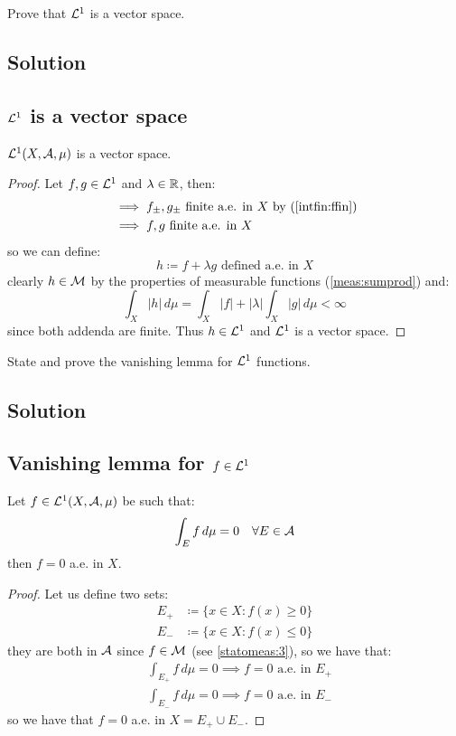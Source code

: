 
\question
Prove that $\mathcal{L}^1$ is a vector space.

\subsection*{Solution}

\subsection{ \texorpdfstring{$\mathcal{L}^1$}{L1} is a vector space}
$\mathcal{L}^1(X,\mathcal{A},\mu)$ is a vector space.

\begin{proof}
    Let $f,g\in\mathcal{L}^1$ and $\lambda\in\mathbb{R}$, then:
    \begin{align*}
        & \implies f_{\pm}, g_{\pm} \text{ finite a.e. in } X \text{ by (\ref{intfin:ffin})} \\
        & \implies f,g \text{ finite a.e. in } X
    \end{align*}
    so we can define:
    \[
        h \coloneqq f+ \lambda g \text{ defined a.e. in } X
    \]
    clearly $h\in\mathcal{M}$ by the properties of measurable functions (\ref{meas:sumprod}) and:
    \[
        \int_X |h| \, d\mu = \int_X |f| + |\lambda| \int_X |g| \, d\mu < \infty 
    \]
    since both addenda are finite. Thus $h\in\mathcal{L}^1$ and 
    $\mathcal{L}^1$ is a vector space.
\end{proof}


\question
State and prove the vanishing lemma for $\mathcal{L}^1$ functions.

\subsection*{Solution}

\subsection{Vanishing lemma for \texorpdfstring{$f\in\mathcal{L}^1$}{integrable functions}}
Let $f\in\mathcal{L}^1(X,\mathcal{A},\mu)$ be such that:
\[
    \int_E f \, d\mu = 0 \quad \forall E \in \mathcal{A}
\]
then $f=0$ a.e. in $X$.

\begin{proof}
    Let us define two sets:
    \begin{align*}
        E_+ & \coloneqq \{x\in X : f(x) \geq 0\} \\
        E_- & \coloneqq \{x\in X : f(x) \leq 0\}
    \end{align*}
    they are both in $\mathcal{A}$ since $f\in\mathcal{M}$ (see \ref{statomeas:3}), so we have that:
    \begin{align*}
        & \int_{E_+} f \, d\mu = 0 \implies f=0 \text{ a.e. in } E_+\\
        & \int_{E_-} f \, d\mu = 0 \implies f=0 \text{ a.e. in } E_-
    \end{align*}
    so we have that $f=0$ a.e. in $X=E_+\cup E_-$.
\end{proof}

